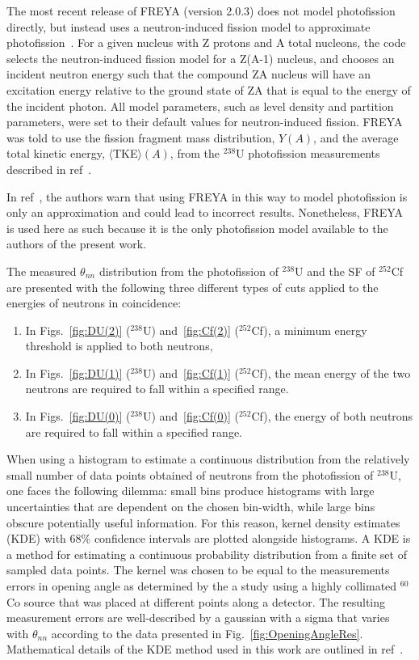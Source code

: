 The most recent release of FREYA (version 2.0.3) does not model photofission directly, but instead uses a neutron-induced fission model to approximate photofission~\cite{FREYA_photofission}.
For a given nucleus with Z protons and A total nucleons, the code selects the neutron-induced fission model for a Z(A-1) nucleus, and chooses an incident neutron energy such that the compound ZA nucleus will have an excitation energy relative to the ground state of ZA that is equal to the energy of the incident photon.
All model parameters, such as level density and partition parameters, were set to their default values for neutron-induced fission.
FREYA was told to use the fission fragment mass distribution, $Y(A)$, and the average total kinetic energy, $\langle$TKE$\rangle(A)$, from the $^{238}$U photofission measurements described in ref~\cite{2017Krishichayan}.

In ref~\cite{Talou2018}, the authors warn that using FREYA in this way to model photofission is only an approximation and could lead to incorrect results.
Nonetheless, FREYA is used here as such because it is the only photofission model available to the authors of the present work.

The measured $\theta_{nn}$ distribution from the photofission of $^{238}$U and the SF of $^{252}$Cf are presented with the following three different types of cuts applied to the energies of neutrons in coincidence:
\begin{enumerate}[label=(\roman*), itemjoin={{, }}, itemjoin*={{, or }}]
    \item In Figs.~\ref{fig:DU(2)} ($^{238}$U) and~\ref{fig:Cf(2)} ($^{252}$Cf), a minimum energy threshold is applied to both neutrons,   \item In Figs.~\ref{fig:DU(1)} ($^{238}$U) and~\ref{fig:Cf(1)} ($^{252}$Cf), the mean energy of the two neutrons are required to fall within a specified range.   
  \item In Figs.~\ref{fig:DU(0)} ($^{238}$U) and~\ref{fig:Cf(0)} ($^{252}$Cf), the energy of both neutrons are required to fall within a specified range.
  \end{enumerate}

When using a histogram to estimate a continuous distribution from the relatively small number of data points obtained of neutrons from the photofission of $^{238}$U, one faces the following dilemma: small bins produce histograms with large uncertainties that are dependent on the chosen bin-width, while large bins obscure potentially useful information. 
For this reason, kernel density estimates (KDE) with 68\% confidence intervals are plotted alongside histograms.
A KDE is a method for estimating a continuous probability distribution from a finite set of sampled data points.
The kernel was chosen to be equal to the measurements errors in opening angle as determined by the a study using a highly collimated $^{60}$Co source that was placed at different points along a detector.
The resulting measurement errors are well-described by a gaussian with a sigma that varies with $\theta_{nn}$ according to the data presented in Fig.~\ref{fig:OpeningAngleRes}.
Mathematical details of the KDE method used in this work are outlined in ref~\cite{KDE}. 

